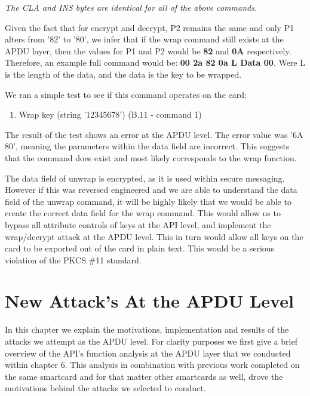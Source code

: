\documentclass[bsc,frontabs,twoside,singlespacing,parskip,deptreport]{infthesis}     %
\begin{document}
\textit{The CLA and INS bytes are identical for all of the above commands.} 

Given the fact that for encrypt and decrypt, P2 remains the same and only P1 alters from '82' to '80', we infer that if the wrap command still exists at the APDU layer, then the values for P1 and P2 would be \textbf{82} and \textbf{0A} respectively. Therefore, an example full command would be: \textbf{00 2a 82 0a L Data 00}. Were L is the length of the data, and the data is the key to be wrapped. 

We ran a simple test to see if this command operates on the card:
\begin{enumerate}
\item Wrap key (string '12345678') (B.11 - command 1)\\
\end{enumerate}


The result of the test shows an error at the APDU level. The error value was '6A 80', meaning the parameters within the data field are incorrect. This suggests that the command does exist and most likely corresponds to the wrap function.

The data field of unwrap is encrypted, as it is used within secure messaging. However if this was reversed engineered and we are able to understand the data field of the unwrap command, it will be highly likely that we would be able to create the correct data field for the wrap command. This would allow us to bypass all attribute controls of keys at the API level, and implement the wrap/decrypt attack at the APDU level. This in turn would allow all keys on the card to be exported out of the card in plain text. This would be a serious violation of the PKCS \#11 standard.







\chapter{New Attack's At the APDU Level}

In this chapter we explain the motivations, implementation and results of the attacks we attempt as the APDU level. For clarity purposes we first give a brief overview of the API's function analysis at the APDU layer that we conducted within chapter 6. This analysis in combination with previous work completed on the same smartcard and for that matter other smartcards as well, drove the motivations behind the attacks we selected to conduct.
\end{document}
